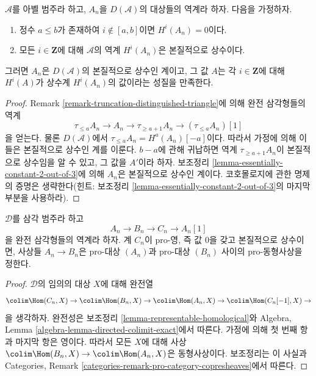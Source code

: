 \begin{lemma}
\label{lemma-essentially-constant-cohomology}
$\mathcal{A}$를 아벨 범주라 하고, $A_n$을 $D(\mathcal{A})$의 대상들의
역계라 하자. 다음을 가정하자.
\begin{enumerate}
\item 정수 $a \leq b$가 존재하여 $i \not \in [a, b]$이면
$H^i(A_n) = 0$이다.
\item 모든 $i \in \mathbf{Z}$에 대해 $\mathcal{A}$의 역계
$H^i(A_n)$은 본질적으로 상수이다.
\end{enumerate}
그러면 $A_n$은 $D(\mathcal{A})$의 본질적으로 상수인 계이고, 그 값
$A$는 각 $i \in \mathbf{Z}$에 대해 $H^i(A)$가 상수계 $H^i(A_n)$의
값이라는 성질을 만족한다.
\end{lemma}

\begin{proof}
Remark \ref{remark-truncation-distinguished-triangle}에 의해 완전
삼각형들의 역계
$$
\tau_{\leq a}A_n \to A_n \to \tau_{\geq a + 1}A_n \to (\tau_{\leq a}A_n)[1]
$$
을 얻는다. 물론 $D(\mathcal{A})$에서
$\tau_{\leq a}A_n = H^a(A_n)[-a]$이다. 따라서 가정에 의해 이들은
본질적으로 상수인 계를 이룬다. $b - a$에 관해 귀납하면 역계
$\tau_{\geq a + 1}A_n$이 본질적으로 상수임을 알 수 있고, 그 값을
$A'$이라 하자. 보조정리 \ref{lemma-essentially-constant-2-out-of-3}에
의해 $A_n$은 본질적으로 상수인 계이다. 코호몰로지에 관한 명제의
증명은 생략한다(힌트: 보조정리
\ref{lemma-essentially-constant-2-out-of-3}의 마지막 부분을 사용하라).
\end{proof}

\begin{lemma}
\label{lemma-pro-isomorphism}
$\mathcal{D}$를 삼각 범주라 하고
$$
A_n \to B_n \to C_n \to A_n[1]
$$
을 완전 삼각형들의 역계라 하자. 계 $C_n$이 pro-영, 즉 값 $0$을 갖고
본질적으로 상수이면, 사상들 $A_n \to B_n$은 pro-대상 $(A_n)$과
pro-대상 $(B_n)$ 사이의 pro-동형사상을 정한다.
\end{lemma}

\begin{proof}
$\mathcal{D}$의 임의의 대상 $X$에 대해 완전열
$$
\colim \Hom(C_n, X) \to
\colim \Hom(B_n, X) \to
\colim \Hom(A_n, X) \to
\colim \Hom(C_n[-1], X) \to
$$
을 생각하자. 완전성은 보조정리 \ref{lemma-representable-homological}와
Algebra, Lemma \ref{algebra-lemma-directed-colimit-exact}에서 따른다.
가정에 의해 첫 번째 항과 마지막 항은 영이다. 따라서 모든 $X$에 대해
사상 $\colim \Hom(B_n, X) \to \colim \Hom(A_n, X)$은 동형사상이다.
보조정리는 이 사실과 Categories, Remark
\ref{categories-remark-pro-category-copresheaves}에서 따른다.
\end{proof}


